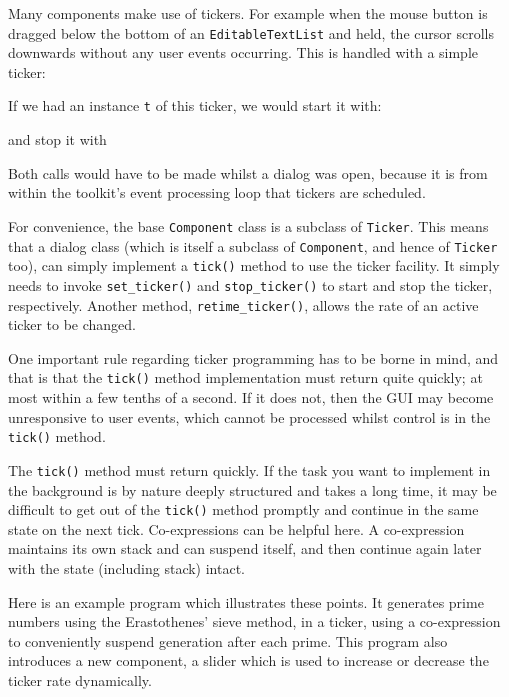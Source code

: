 Many components make use of tickers. For example when the mouse button
is dragged below the bottom of an \texttt{EditableTextList} and held,
the cursor scrolls downwards without any user events occurring. This
is handled with a simple ticker:


\noindent
If we had an instance \texttt{t} of this ticker, we would start it with:


\noindent and stop it with


Both calls would have to be made whilst a dialog was open, because it is
from within the toolkit's event processing loop that
tickers are scheduled.

For convenience, the base \texttt{Component} class is a subclass of
\texttt{Ticker}. This means that a dialog class (which is itself a
subclass of \texttt{Component}, and hence of \texttt{Ticker} too), can
simply implement a \texttt{tick()} method to use the ticker facility.
It simply needs to invoke \texttt{set\_ticker()} and
\texttt{stop\_ticker()} to start and stop the ticker, respectively.
Another method, \texttt{retime\_ticker()}, allows the rate of an
active ticker to be changed.

One important rule regarding ticker programming has to be borne in mind,
and that is that the \texttt{tick()} method implementation must return
quite quickly; at most within a few tenths of a second. If it does
not, then the GUI may become unresponsive to user events, which cannot
be processed whilst control is in the \texttt{tick()} method.

The \texttt{tick()} method must return quickly. If the
task you want to implement in the background is by nature deeply
structured and takes a long time, it may be difficult
to get out of the \texttt{tick()} method promptly and continue in the
same state on the next tick.  Co-expressions can
be helpful here. A co-expression
maintains its own stack and can suspend itself, and then
continue again later with the state (including stack) intact.

Here is an example program which illustrates these points. It
generates prime numbers using the Erastothenes' sieve
method, in a ticker, using a co-expression to conveniently suspend
generation after each prime.
This program also introduces a new component, a slider which is
used to increase or decrease the ticker rate dynamically.

